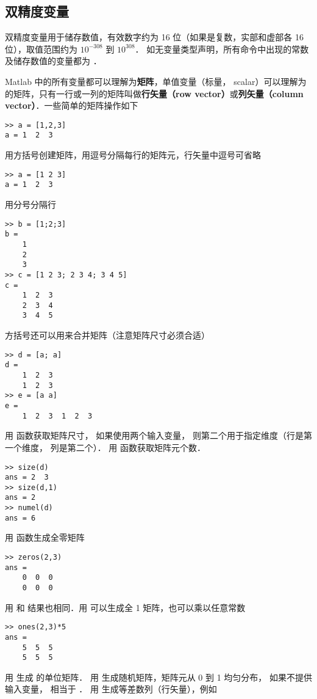 \subsection{双精度变量}

双精度变量用于储存数值，有效数字约为 16 位（如果是复数，实部和虚部各 16 位），取值范围约为 $10^{-308}$ 到 $10^{308}$． 如无变量类型声明，所有命令中出现的常数及储存数值的变量都为 ．

Matlab 中的所有变量都可以理解为\textbf{矩阵}，单值变量（标量， scalar）可以理解为  的矩阵，只有一行或一列的矩阵叫做\textbf{行矢量（row vector）}或\textbf{列矢量（column vector）}．一些简单的矩阵操作如下
\begin{lstlisting}[language=MatlabCom]
>> a = [1,2,3]
a = 1  2  3
\end{lstlisting}
用方括号创建矩阵，用逗号分隔每行的矩阵元，行矢量中逗号可省略%
\begin{lstlisting}[language=MatlabCom]
>> a = [1 2 3]
a = 1  2  3
\end{lstlisting}
用分号分隔行
\begin{lstlisting}[language=MatlabCom]
>> b = [1;2;3]
b =
    1
    2
    3
>> c = [1 2 3; 2 3 4; 3 4 5]
c =
    1  2  3
    2  3  4
    3  4  5
\end{lstlisting}
方括号还可以用来合并矩阵（注意矩阵尺寸必须合适）
\begin{lstlisting}[language=MatlabCom]
>> d = [a; a]
d =
    1  2  3
    1  2  3
>> e = [a a]
e =
    1  2  3  1  2  3
\end{lstlisting}
用  函数获取矩阵尺寸， 如果使用两个输入变量， 则第二个用于指定维度（行是第一个维度， 列是第二个）． 用  函数获取矩阵元个数．
\begin{lstlisting}[language=MatlabCom]
>> size(d)
ans = 2  3
>> size(d,1)
ans = 2
>> numel(d)
ans = 6
\end{lstlisting}
用  函数生成全零矩阵
\begin{lstlisting}[language=MatlabCom]
>> zeros(2,3)
ans =
    0  0  0
    0  0  0
\end{lstlisting}
用  和  结果也相同．用  可以生成全 1 矩阵，也可以乘以任意常数
\begin{lstlisting}[language=MatlabCom]
>> ones(2,3)*5
ans =
    5  5  5
    5  5  5
\end{lstlisting}
用  生成  的单位矩阵． 用  生成随机矩阵，矩阵元从 0 到 1 均匀分布， 如果不提供输入变量，  相当于 ． 用  生成等差数列（行矢量），例如
